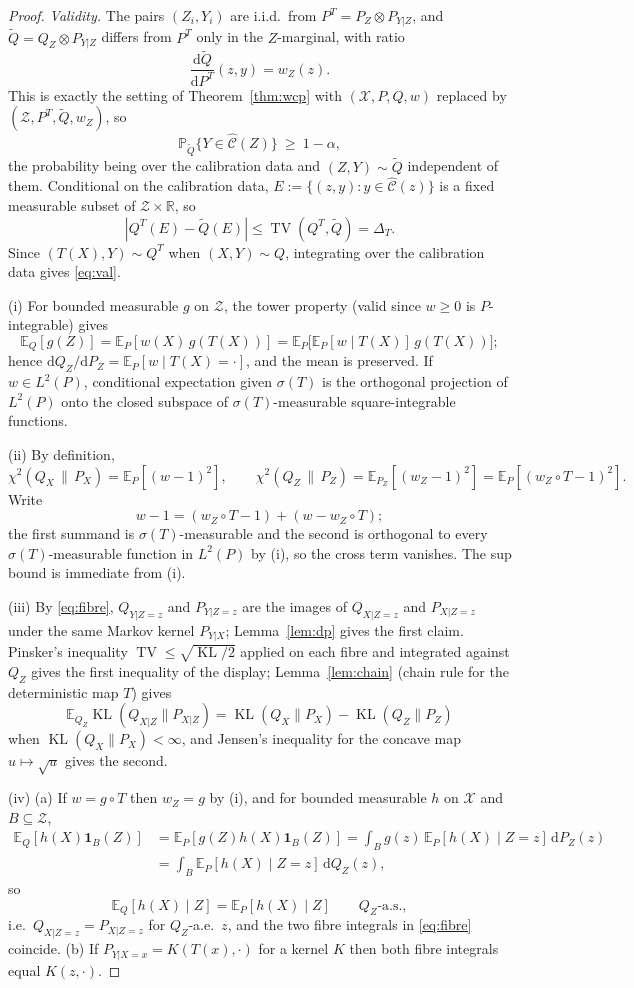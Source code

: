 \documentclass[11pt,a4paper]{article}
\newcommand{\PX}{P_X}
\newcommand{\QX}{Q_X}
\newcommand{\chisq}{\chi^2(\QX\,\|\,\PX)}
\newcommand{\chisqZ}{\chi^2(Q_Z\,\|\,P_Z)}
\newcommand{\E}{\mathbb{E}}
\newcommand{\Prob}{\mathbb{P}}
\newcommand{\R}{\mathbb{R}}
\newcommand{\TV}{\operatorname{TV}}
\newcommand{\KL}{\operatorname{KL}}
\newcommand{\Cset}{\widehat{\mathcal C}}
\newcommand{\Zc}{\mathcal Z}
\newcommand{\Qt}{\widetilde Q}
\newcommand{\ind}{\mathbf 1}
\theoremstyle{plain}
\theoremstyle{definition}
\theoremstyle{remark}
\begin{document}
\begin{proof}
\emph{Validity.} The pairs $(Z_i,Y_i)$ are i.i.d.\ from $P^T=P_Z\otimes P_{Y|Z}$, and $\Qt=Q_Z\otimes P_{Y|Z}$ differs from $P^T$ only in the $Z$-marginal, with ratio
\[
\frac{\mathrm d\Qt}{\mathrm dP^T}(z,y)=w_Z(z).
\]
This is exactly the setting of Theorem~\ref{thm:wcp} with $(\mathcal X,P,Q,w)$ replaced by $(\Zc,P^T,\Qt,w_Z)$, so
\[
\Prob_{\Qt}\bigl\{Y\in\Cset(Z)\bigr\}\ \ge\ 1-\alpha,
\]
the probability being over the calibration data and $(Z,Y)\sim\Qt$ independent of them. Conditional on the calibration data, $E:=\{(z,y):y\in\Cset(z)\}$ is a fixed measurable subset of $\Zc\times\R$, so
\[
|Q^T(E)-\Qt(E)|\le\TV(Q^T,\Qt)=\Delta_T.
\]
Since $(T(X),Y)\sim Q^T$ when $(X,Y)\sim Q$, integrating over the calibration data gives \eqref{eq:val}.

(i) For bounded measurable $g$ on $\Zc$, the tower property (valid since $w\ge0$ is $P$-integrable) gives
\[
\E_Q[g(Z)]=\E_P[w(X)\,g(T(X))]=\E_P\bigl[\E_P[w\mid T(X)]\,g(T(X))\bigr];
\]
hence $\mathrm dQ_Z/\mathrm dP_Z=\E_P[w\mid T(X)=\cdot]$, and the mean is preserved. If $w\in L^2(P)$, conditional expectation given $\sigma(T)$ is the orthogonal projection of $L^2(P)$ onto the closed subspace of $\sigma(T)$-measurable square-integrable functions.

(ii) By definition,
\[
\chisq=\E_P[(w-1)^2],\qquad \chisqZ=\E_{P_Z}[(w_Z-1)^2]=\E_P[(w_Z\circ T-1)^2].
\]
Write
\[
w-1=(w_Z\circ T-1)+(w-w_Z\circ T);
\]
the first summand is $\sigma(T)$-measurable and the second is orthogonal to every $\sigma(T)$-measurable function in $L^2(P)$ by (i), so the cross term vanishes. The sup bound is immediate from (i).

(iii) By \eqref{eq:fibre}, $Q_{Y|Z=z}$ and $P_{Y|Z=z}$ are the images of $Q_{X|Z=z}$ and $P_{X|Z=z}$ under the same Markov kernel $P_{Y|X}$; Lemma~\ref{lem:dp} gives the first claim. Pinsker's inequality $\TV\le\sqrt{\KL/2}$ applied on each fibre and integrated against $Q_Z$ gives the first inequality of the display; Lemma~\ref{lem:chain} (chain rule for the deterministic map $T$) gives
\[
\E_{Q_Z}\KL(Q_{X|Z}\|P_{X|Z})=\KL(\QX\|\PX)-\KL(Q_Z\|P_Z)
\]
when $\KL(\QX\|\PX)<\infty$, and Jensen's inequality for the concave map $u\mapsto\sqrt u$ gives the second.

(iv) (a) If $w=g\circ T$ then $w_Z=g$ by (i), and for bounded measurable $h$ on $\mathcal X$ and $B\subseteq\Zc$,
\begin{align*}
\E_Q[h(X)\ind_B(Z)]&=\E_P[g(Z)h(X)\ind_B(Z)]=\int_B g(z)\,\E_P[h(X)\mid Z=z]\,\mathrm dP_Z(z)\\
&=\int_B\E_P[h(X)\mid Z=z]\,\mathrm dQ_Z(z),
\end{align*}
so
\[
\E_Q[h(X)\mid Z]=\E_P[h(X)\mid Z]\qquad Q_Z\text{-a.s.},
\]
i.e.\ $Q_{X|Z=z}=P_{X|Z=z}$ for $Q_Z$-a.e.\ $z$, and the two fibre integrals in \eqref{eq:fibre} coincide. (b) If $P_{Y|X=x}=K(T(x),\cdot)$ for a kernel $K$ then both fibre integrals equal $K(z,\cdot)$.
\end{proof}
\end{document}
